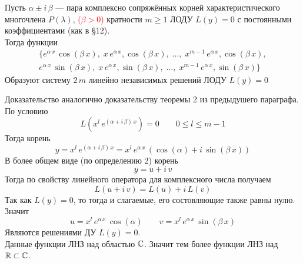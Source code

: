 \begin{Th}
    Пусть $\alpha \pm i\,\beta$  --- пара комплексно сопряжённых корней характеристического многочлена $P(\lambda)$, \textcolor{red}{($\beta > 0$)} кратности $m \geqslant 1$ ЛОДУ $L(y) = 0$ с постоянными коэффициентами (как в \S 12).\\
    Тогда функции 
    \begin{multline*}
        \{e^{\alpha\,x}\,\cos(\beta\,x),\; x\,e^{\alpha\,x},\cos(\beta\,x),\; \dots,\; x^{m-1}\,e^{\alpha\,x},\cos(\beta\,x),\\ e^{\alpha\,x}\,\sin(\beta\,x),\; x\,e^{\alpha\,x},\sin(\beta\,x),\; \dots,\; x^{m-1}\,e^{\alpha\,x},\sin(\beta\,x)\}
    \end{multline*}
    Образуют систему $2\,m$ линейно независимых решений ЛОДУ $L(y) = 0$
\end{Th}

\begin{Proof}
    Доказательство аналогично доказательству теоремы 2 из предыдушего параграфа.\\
    По условию
    \[
        L(x^l\,e^{(\alpha + i\,\beta)\,x}) = 0 \qquad 0 \leqslant l \leqslant m - 1
    \]
    Тогда корень
    \[
        y = x^l\,e^{(\alpha + i\,\beta)\,x} = x^l\,e^{\alpha\,x}\,(\cos(\alpha) + i\,\sin(\beta\,x))
    \]
    В более общем виде (по определению 2) корень
    \[
        y = u + i\,v
    \]
    Тогда по свойству линейного оператора для комплексного числа получаем
    \[
        L(u + i\,v) = L(u) + i\,L(v)
    \]
    Так как $L(y) = 0$, то тогда и слагаемые, его состовляющие также равны нулю. Значит
    \[
        u = x^l\,e^{\alpha\,x}\,\cos(\alpha) \qquad v = x^l\,e^{\alpha\,x}\,\sin(\beta\,x)
    \]
    Являются решениями ДУ $L(y) = 0$.\\
    Данные функции ЛНЗ над областью $\mathbb{C}$. Значит тем более функции ЛНЗ над $\mathbb{R} \subset \mathbb{C}$.
\end{Proof}

